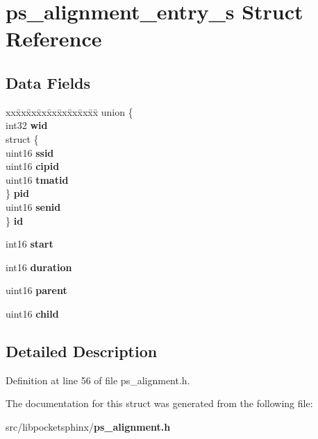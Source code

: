 \section{ps\+\_\+alignment\+\_\+entry\+\_\+s Struct Reference}
\label{structps__alignment__entry__s}
\subsection*{Data Fields}
\begin{DoxyCompactItemize}
\item 
\begin{tabbing}
xx\=xx\=xx\=xx\=xx\=xx\=xx\=xx\=xx\=\kill
union \{\\
\>int32 {\bfseries wid}\\
\>struct \{\\
\>\>uint16 {\bfseries ssid}\\
\>\>uint16 {\bfseries cipid}\\
\>\>uint16 {\bfseries tmatid}\\
\>\} {\bfseries pid}\\
\>uint16 {\bfseries senid}\\
\} {\bfseries id}\label{structps__alignment__entry__s_a3c41870e66f6813e327a29c1d9b8d3bc}
\\

\end{tabbing}\item 
int16 {\bfseries start}\label{structps__alignment__entry__s_ac3b469463845542c8d29b7c6c4e0f29e}

\item 
int16 {\bfseries duration}\label{structps__alignment__entry__s_ad5559bb3e102d94e614d6b0357bda3ad}

\item 
uint16 {\bfseries parent}\label{structps__alignment__entry__s_aef8dfacf69640a3ff88514298aa8f54a}

\item 
uint16 {\bfseries child}\label{structps__alignment__entry__s_a5f8b29052c7257a83af07018dddb7eff}

\end{DoxyCompactItemize}


\subsection{Detailed Description}


Definition at line 56 of file ps\+\_\+alignment.\+h.



The documentation for this struct was generated from the following file\+:\begin{DoxyCompactItemize}
\item 
src/libpocketsphinx/{\bf ps\+\_\+alignment.\+h}\end{DoxyCompactItemize}
